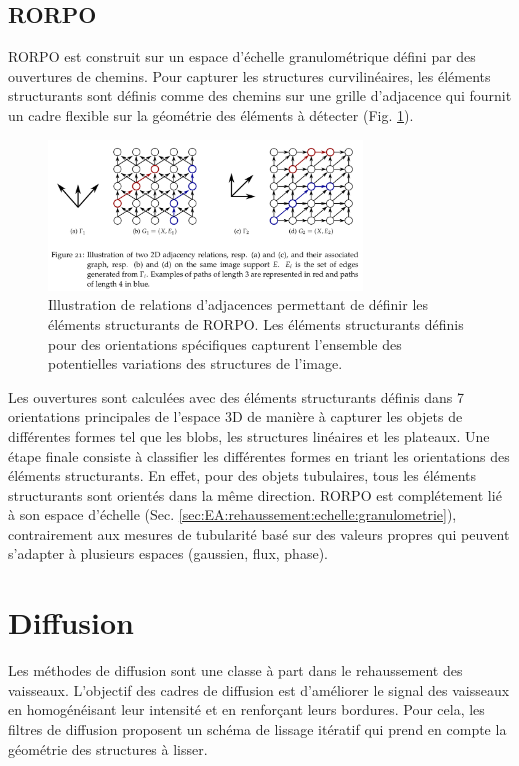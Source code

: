 \subsection{RORPO}

RORPO \cite{Merveille2018_curvilinear} est construit sur un espace d'échelle granulométrique défini par des ouvertures de chemins. Pour capturer les structures curvilinéaires, les éléments structurants sont définis comme des chemins sur une grille d'adjacence qui fournit un cadre flexible sur la géométrie des éléments à détecter (Fig. \ref{fig:rorpo_adjacency}). 

\begin{figure}[ht]
  \centering
  \includegraphics[height=4cm]{Images/rorpo_path.png}
  \caption{Illustration de relations d'adjacences permettant de définir les éléments structurants de RORPO. Les éléments structurants définis pour des orientations spécifiques capturent l'ensemble des potentielles variations des structures de l'image.}
  \label{fig:rorpo_adjacency}
\end{figure}

Les ouvertures sont calculées avec des éléments structurants définis dans 7 orientations principales de l'espace 3D de manière à capturer les objets de différentes formes tel que les blobs, les structures linéaires et les plateaux. Une étape finale consiste à classifier les différentes formes en triant les orientations des éléments structurants. En effet, pour des objets tubulaires, tous les éléments structurants sont orientés dans la même direction. RORPO est complétement lié à son espace d'échelle (Sec. \ref{sec:EA:rehaussement:echelle:granulometrie}), contrairement aux mesures de tubularité basé sur des valeurs propres qui peuvent s'adapter à plusieurs espaces (gaussien, flux, phase).

\section{Diffusion}
\label{sec:EA:rehaussement:diffusion}

Les méthodes de diffusion sont une classe à part dans le rehaussement des vaisseaux. L'objectif des cadres de diffusion est d'améliorer le signal des vaisseaux en homogénéisant leur intensité et en renforçant leurs bordures. Pour cela, les filtres de diffusion proposent un schéma de lissage itératif qui prend en compte la géométrie des structures à lisser.

